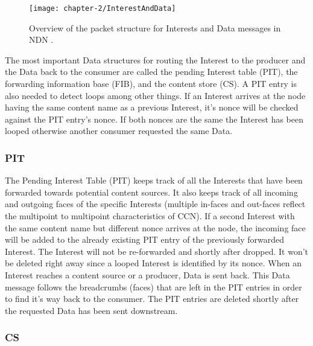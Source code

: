 \vspace{5mm} %

\begin{figure}[H]
  \centering
  \texttt{[image: chapter-2/InterestAndData]}
  \caption{Overview of the packet structure for Interests and Data messages in NDN \cite{ndnWiki}.}
  \label{fig:InterestAndData}
\end{figure}

\vspace{5mm} %

The most important Data structures for routing the Interest to the producer and the Data back to the consumer are called the pending Interest table (PIT), the forwarding information base (FIB), and the content store (CS). A PIT entry is also needed to detect loops among other things. If an Interest arrives at the node having the same content name as a previous Interest, it's nonce will be checked against the PIT entry's nonce. If both nonces are the same the Interest has been looped otherwise another consumer requested the same Data.

\subsubsection{PIT}

The Pending Interest Table (PIT) keeps track of all the Interests that have been forwarded towards potential content sources. It also keeps track of all incoming and outgoing faces of the specific Interests (multiple in-faces and out-faces reflect the multipoint to multipoint characteristics of CCN). If a second Interest with the same content name but different nonce arrives at the node, the incoming face will be added to the already existing PIT entry of the previously forwarded Interest. The Interest will not be re-forwarded and shortly after dropped. It won't be deleted right away since a looped Interest is identified by its nonce. When an Interest reaches a content source or a producer, Data is sent back.  This Data message follows the breadcrumbs (faces) that are left in the PIT entries in order to find it's way back to the consumer. The PIT entries are deleted shortly after the requested Data has been sent downstream.

\subsubsection{CS} 


